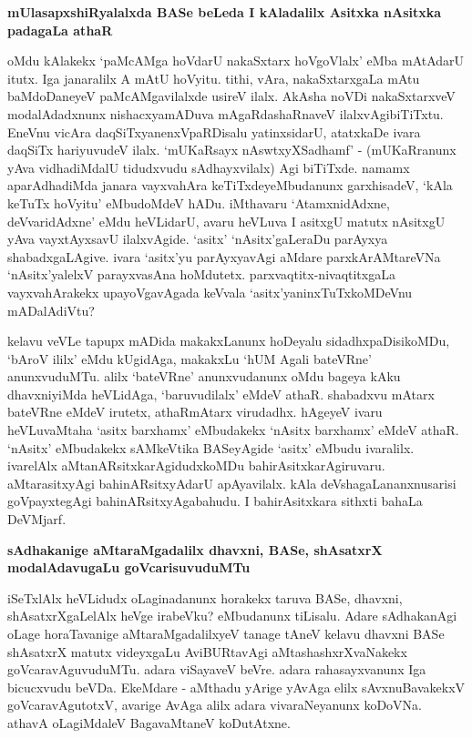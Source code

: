 {\bigskip
\noindent
{\large\bf mUlasapxshiRyalalxda BASe beLeda I kAladalilx Asitxka nAsitxka padagaLa athaR}}\label{page189}
\medskip

\noindent
oMdu kAlakekx `paMcAMga hoVdarU nakaSxtarx hoVgoVlalx' eMba mAtAdarU itutx. Iga janaralilx A mAtU hoVyitu. tithi, vAra, nakaSxtarxgaLa mAtu baMdoDaneyeV paMcAMgavilalxde usireV ilalx. AkAsha noVDi nakaSxtarxveV modalAdadxnunx nishacxyamADuva mAgaRdashaRnaveV ilalxvAgibiTiTxtu. EneVnu vicAra daqSiTxyanenxVpaR\-Disalu yatinxsidarU, atatxkaDe ivara daqSiTx hariyuvudeV ilalx. `mUKaRsayx nAswtxyXSa\-dhamf'\label{189} - (mUKaRranunx yAva vidhadiMdalU tidudxvudu sAdhayxvilalx) Agi biTiTxde. namamx aparAdhadiMda janara vayxvahAra keTiTxdeyeMbudanunx garxhisadeV, `kAla keTuTx hoVyitu' eMbudoMdeV hADu. iMthavaru `AtamxnidAdxne, deVvaridAdxne' eMdu heVLidarU, avaru heVLuva I asitxgU matutx nAsitxgU yAva vayxtAyxsavU ilalxvAgide. `asitx' `nAsitx'gaLeraDu parAyxya shabadx\-gaLAgive. ivara `asitx'yu parAyxyavAgi aMdare parxkArAMtareVNa `nAsitx'yalelxV parayxvasAna hoMdutetx. parx\-vaqtitx-nivaqtitxgaLa vayxvahArakekx upayoVgavAgada keVvala `asitx'yaninxTuTxkoMDeVnu mADalAdiVtu? 

kelavu veVLe tapupx mADida makakxLanunx hoDeyalu sidadhxpaDisikoMDu, `bAroV ililx' eMdu kUgidAga, makakxLu `hUM Agali bateVRne' anunxvuduMTu. alilx `bateVRne' anunxvudanunx oMdu bageya kAku dhavxniyiMda heVLidAga, `baruvudilalx' eMdeV athaR. shabadxvu mAtarx bateVRne eMdeV irutetx, athaRmAtarx virudadhx. hAgeyeV ivaru heVLuvaMtaha `asitx barxhamx' eMbudakekx `nAsitx barxhamx' eMdeV athaR. `nAsitx' eMbudakekx sAMkeVtika BASeyAgide `asitx' eMbudu ivaralilx. ivarelAlx aMtanARsitxkarAgidudxkoMDu bahirAsitxka\-rAgiruvaru. aMtarasitxyAgi bahinARsitxyAdarU apAyavilalx. kAla deVshagaLananxnusarisi goVpayxte\-gAgi bahinARsitxyAgabahudu. I bahirAsitxkara sithxti bahaLa DeVMjarf.

{\bigskip
\noindent
{\large\bf sAdhakanige aMtaraMgadalilx dhavxni, BASe, shAsatxrX modalAdavugaLu goVcarisuvuduMTu}}\label{page189}
\medskip

\noindent
iSeTxlAlx heVLidudx oLaginadanunx horakekx taruva BASe, dhavxni, shAsatxrXgaLelAlx heVge irabeVku? eMbudanunx tiLisalu. Adare sAdhakanAgi oLage horaTavanige aMtaraMgadalilxyeV tanage tAneV kelavu dhavxni BASe shAsatxrX matutx videyxgaLu AviBURtavAgi aMtashashxrXvaNakekx goVcaravAguvuduMTu. adara viSayaveV beVre. adara rahasayxvanunx Iga bicucxvudu beVDa. EkeMdare - aMthadu yArige yAvAga elilx sAvxnuBavakekxV goVcaravA\-gutotxV, avarige AvAga alilx adara vivaraNeyanunx koDoVNa. athavA oLagiMdaleV Baga\-vaMtaneV koDutAtxne.

